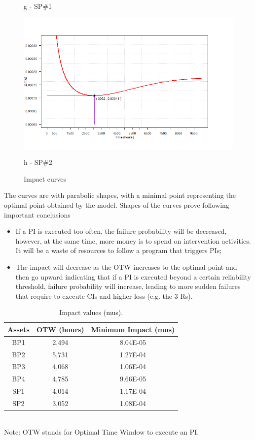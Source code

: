 \begin{figure}[!htb]
\begin{minipage}[b]{0.5\linewidth}
	\caption*{g -  SP\#1}
\end{minipage}
	\hspace{0.05cm}
\begin{minipage}[b]{0.5\linewidth}
	\centering
	\includegraphics[width=\textwidth]{figures/ch05_fig_ois_pump6}
	\caption*{h - SP\#2}
\end{minipage}
\caption{Impact curves}
\label{ch05_fig_ois}
\end{figure}

The curves are with parabolic shapes, with a minimal point representing the optimal point obtained by the model. Shapes of the curves prove following important conclusions

\begin{itemize}
\item If a PI is executed too often, the failure probability will be decreased, however, at the same time, more money is to spend on intervention activities. It will be a waste of resources to follow a program that triggers PIs;
\item The impact will decrease as the OTW increases to the optimal point and then go upward indicating that if a PI is executed beyond a certain reliability threshold, failure probability will increase, leading to more sudden failures that require to execute CIs and higher loss (e.g. the 3 Rs).
\end{itemize}


\begin{table}[h]
	\caption{Impact values (mus).}
	\label{ch05_tbl_impactvalue02}
	{\footnotesize
\begin{tabular}{c|c|c}
	\hline
	Assets & OTW (hours) & Minimum Impact (mus) \\ 
	\hline
	BP1 & 2,494 & 8.04E-05 \\ 
	BP2 & 5,731 & 1.27E-04 \\ 
	BP3 & 4,068 & 1.06E-04 \\ 
	BP4 & 4,785 & 9.66E-05 \\ 
	SP1 & 4,014 & 1.17E-04 \\ 
	SP2 & 3,052 & 1.08E-04 \\ 
	\hline
\end{tabular}\\
		Note: OTW stands for Optimal Time Window to execute an PI.
	}
\end{table}

